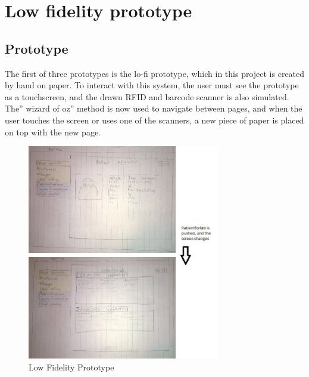 \chapter{Low fidelity prototype}

\section{Prototype}
The first of three prototypes is the lo-fi prototype, which in this project is created by hand on paper. To interact with this system, the user must see the prototype as a touchscreen, and the drawn RFID and barcode scanner is also simulated. The” wizard of oz” method is now used to navigate between pages, and when the user touches the screen or uses one of the scanners, a new piece of paper is placed on top with the new page. 
\begin{figure}[H]
\centering
\includegraphics[width=0.75\textwidth]{billeder/lofi}
\caption{Low Fidelity Prototype}
\end{figure}


